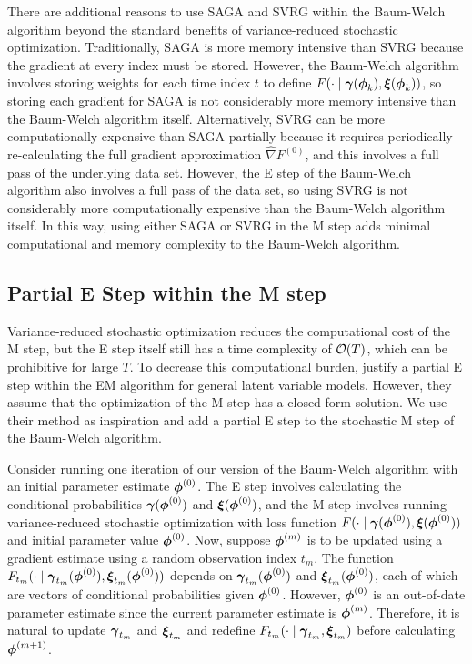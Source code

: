 There are additional reasons to use SAGA and SVRG within the Baum-Welch algorithm beyond the standard benefits of variance-reduced stochastic optimization. Traditionally, SAGA is more memory intensive than SVRG because the gradient at every index must be stored. However, the Baum-Welch algorithm involves storing weights for each time index $t$ to define $F(\cdot \mid \boldsymbol{\gamma}(\boldsymbol{\phi}_k), \boldsymbol{\xi}(\boldsymbol{\phi}_k))$, so storing each gradient for SAGA is not considerably more memory intensive than the Baum-Welch algorithm itself. Alternatively, SVRG can be more computationally expensive than SAGA partially because it requires periodically re-calculating the full gradient approximation $\widehat \nabla F^{(0)}$, and this involves a full pass of the underlying data set. However, the E step of the Baum-Welch algorithm also involves a full pass of the data set, so using SVRG is not considerably more computationally expensive than the Baum-Welch algorithm itself. In this way, using either SAGA or SVRG in the M step adds minimal computational and memory complexity to the Baum-Welch algorithm.

\subsection{Partial E Step within the M step}
\label{subsec:stoch_E}

Variance-reduced stochastic optimization reduces the computational cost of the M step, but the E step itself still has a time complexity of $\mathcal{O}(T)$, which can be prohibitive for large $T$. To decrease this computational burden, \citet{Neal:1998} justify a partial E step within the EM algorithm for general latent variable models. However, they assume that the optimization of the M step has a closed-form solution. We use their method as inspiration and add a partial E step to the stochastic M step of the Baum-Welch algorithm. 

Consider running one iteration of our version of the Baum-Welch algorithm with an initial parameter estimate $\boldsymbol{\phi}^{(0)}$. The E step involves calculating the conditional probabilities $\boldsymbol{\gamma}(\boldsymbol{\phi}^{(0)})$ and $\boldsymbol{\xi}(\boldsymbol{\phi}^{(0)})$, and the M step involves running variance-reduced stochastic optimization with loss function $F(\cdot \mid \boldsymbol{\gamma}(\boldsymbol{\phi}^{(0)}),\boldsymbol{\xi}(\boldsymbol{\phi}^{(0)}))$ and initial parameter value $\boldsymbol{\phi}^{(0)}$. Now, suppose $\boldsymbol{\phi}^{(m)}$ is to be updated using a gradient estimate using a random observation index $t_m$. The function $F_{t_m}(\cdot \mid \boldsymbol{\gamma}_{t_m}(\boldsymbol{\phi}^{(0)}),\boldsymbol{\xi}_{t_m}(\boldsymbol{\phi}^{(0)}))$ depends on $\boldsymbol{\gamma}_{t_m}(\boldsymbol{\phi}^{(0)})$ and $\boldsymbol{\xi}_{t_m}(\boldsymbol{\phi}^{(0)})$, each of which are vectors of conditional probabilities given $\boldsymbol{\phi}^{(0)}$. However, $\boldsymbol{\phi}^{(0)}$ is an out-of-date parameter estimate since the current parameter estimate is $\boldsymbol{\phi}^{(m)}$. Therefore, it is natural to update $\boldsymbol{\gamma}_{t_m}$ and $\boldsymbol{\xi}_{t_m}$ and redefine $F_{t_m}(\cdot \mid \boldsymbol{\gamma}_{t_m}, \boldsymbol{\xi}_{t_m})$ before calculating $\boldsymbol{\phi}^{(m+1)}$. 

